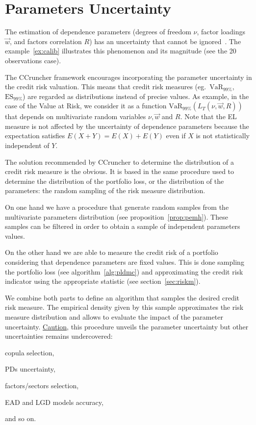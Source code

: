 \documentclass[11pt,fleqn]{book} %
\begin{document}
\section{Parameters Uncertainty}

The estimation of dependence parameters (degrees of freedom $\nu$, factor
loadings $\vec{w}$, and factors correlation $R$) has an uncertainty that 
cannot be ignored~\cite{tarashev:2010,gossl:2005}. The example~\ref{ex:calib} 
illustrates this phenomenon and its magnitude (see the 20 observations case).

The CCruncher framework encourages incorporating the parameter uncertainty 
in the credit risk valuation. This means that credit risk measures
(eg.\ $\text{VaR}_{99\%}$, $\text{ES}_{99\%}$) are regarded as distributions 
instead of precise values. As example, in the case of the Value at Risk, we 
consider it as a function $\text{VaR}_{99\%}(L_T(\nu,\vec{w},R))$ that 
depends on multivariate random variables $\nu, \vec{w}$ and $R$.
Note that the EL measure is not affected by the uncertainty of dependence 
parameters because the expectation satisfies $E(X+Y)=E(X)+E(Y)$ even if $X$ 
is not statistically independent of $Y$.

The solution recommended by CCruncher to determine the distribution of a
credit risk measure is the obvious. It is based in the same procedure 
used to determine the distribution of the portfolio loss, or the distribution 
of the parameters: the random sampling of the risk measure distribution. 

On one hand we have a procedure that generate random samples from the 
multivariate parameters distribution (see proposition~\ref{prop:pemh}).
These samples can be filtered in order to obtain a sample of independent
parameters values.

On the other hand we are able to measure the credit risk of a portfolio 
considering that dependence parameters are fixed values. This is done 
sampling the portfolio loss (see algorithm~\ref{alg:pldmc}) and approximating 
the credit risk indicator using the appropriate statistic (see 
section~\ref{sec:riskm}).

We combine both parts to define an algorithm that samples the desired
credit risk measure. The empirical density given by this sample 
approximates the risk measure distribution and allows to evaluate the 
impact of the parameter uncertainty. \ul{Caution}, this procedure unveils 
the parameter uncertainty but other uncertainties remains undercovered:
\begin{inparaenum}[1)]
	\item copula selection, 
	\item PDs uncertainty,
	\item factors/sectors selection,
	\item EAD and LGD models accuracy,
	\item and so on.
\end{inparaenum}
\end{document}

